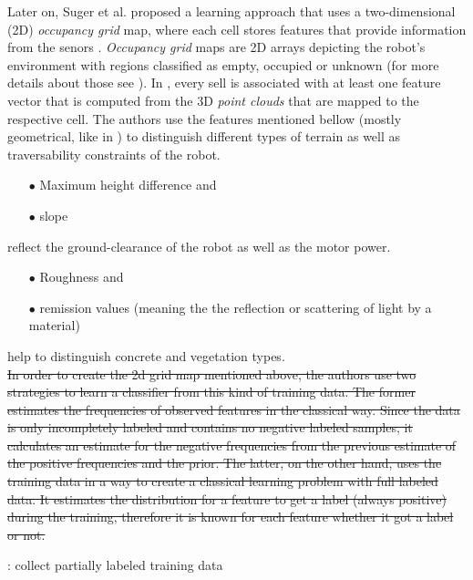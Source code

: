 \documentclass[12pt,a4paper]{report}
\newcommand{\term}{\textit}
\newcommand{\acronym}{\MakeUppercase}
\begin{document}
	Later on, Suger et al. proposed a learning approach that uses a two-dimensional 
	(\acronym{2d}) \term{occupancy grid} map, where each cell stores features 
	that provide information from the senors \cite{Suger}. \term{Occupancy grid} 
	maps are \acronym{2d} arrays depicting the robot’s environment with regions 
	classified as empty, occupied or unknown (for more details about those see 
	\cite{Moravec}). In \cite{Suger}, every sell is associated with at least one 
	feature vector that is computed from the \acronym{3d} \term{point clouds} that 
	are mapped to the respective cell. The authors use the features mentioned 
	bellow (mostly geometrical, like in \cite{Lalonde}) to distinguish different 
	types of terrain as well as traversability constraints of the robot. 
	\begin{enumerate}
		\item[$\bullet$] Maximum height difference and
		\item[$\bullet$] slope 
	\end{enumerate}
	reflect the ground-clearance of the robot as well as the motor power.
	\begin{enumerate}
		\item[$\bullet$] Roughness and
		\item[$\bullet$] remission values (meaning the the reflection or scattering 
		of light by a material) 
	\end{enumerate}
	help to distinguish concrete and vegetation types.
	\\
	
	
	
	
	
	
	\sout{In order to create the 2d grid map mentioned above, the authors use two 
	strategies to learn a classifier from this kind of 
	training data. The former estimates the frequencies of observed	features in the 
	classical way. Since the data is only incompletely labeled and contains no 
	negative labeled samples, it calculates an estimate for the negative 
	frequencies from the previous estimate of the positive frequencies and the prior. The 
	latter, on the other hand, uses the training data in a way to create a classical 
	learning problem with full labeled data. It estimates the distribution for a 
	feature to get a label (always positive) during the training, therefore it is 
	known for each feature whether it got a label or not.}
	
	\cite{Suger}: collect partially labeled training data
	
\end{document}
